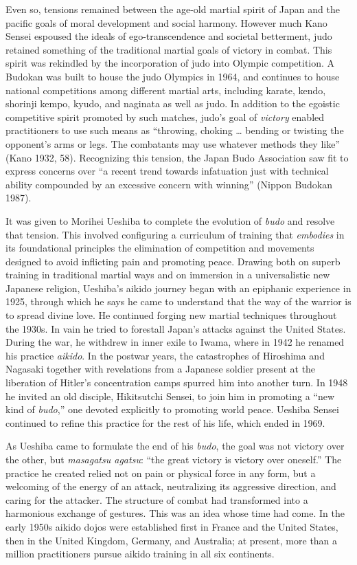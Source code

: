 Even so, tensions remained between the age-old martial spirit of Japan and the pacific goals of moral development and social harmony. However much Kano Sensei espoused the ideals of ego-transcendence and societal betterment, judo retained something of the traditional martial goals of victory in combat. This spirit was rekindled by the incorporation of judo into Olympic competition. A Budokan was built to house the judo Olympics in 1964, and continues to house national competitions among different martial arts, including karate, kendo, shorinji kempo, kyudo, and naginata as well as judo. In addition to the egoistic competitive spirit promoted by such matches, judo's goal of \emph{victory} enabled practitioners to use such means as ``throwing, choking \ldots{} bending or twisting the opponent's arms or legs. The combatants may use whatever methods they like'' (Kano 1932, 58). Recognizing this tension, the Japan Budo Association saw fit to express concerns over ``a recent trend towards infatuation just with technical ability compounded by an excessive concern with winning'' (Nippon Budokan 1987).

It was given to Morihei Ueshiba to complete the evolution of \emph{budo} and resolve that tension. This involved configuring a curriculum of training that \emph{embodies} in its foundational principles the elimination of competition and movements designed to avoid inflicting pain and promoting peace. Drawing both on superb training in traditional martial ways and on immersion in a universalistic new Japanese religion, Ueshiba's aikido journey began with an epiphanic experience in 1925, through which he says he came to understand that the way of the warrior is to spread divine love. He continued forging new martial techniques throughout the 1930s. In vain he tried to forestall Japan's attacks against the United States. During the war, he withdrew in inner exile to Iwama, where in 1942 he renamed his practice \emph{aikido}. In the postwar years, the catastrophes of Hiroshima and Nagasaki together with revelations from a Japanese soldier present at the liberation of Hitler's concentration camps spurred him into another turn. In 1948 he invited an old disciple, Hikitsutchi Sensei, to join him in promoting a ``new kind of \emph{budo},'' one devoted explicitly to promoting world peace. Ueshiba Sensei continued to refine this practice for the rest of his life, which ended in 1969.

As Ueshiba came to formulate the end of his \emph{budo}, the goal was not victory over the other, but \emph{masagatsu agatsu}: ``the great victory is victory over oneself.'' The practice he created relied not on pain or physical force in any form, but a welcoming of the energy of an attack, neutralizing its aggressive direction, and caring for the attacker. The structure of combat had transformed into a harmonious exchange of gestures. This was an idea whose time had come. In the early 1950s aikido dojos were established first in France and the United States, then in the United Kingdom, Germany, and Australia; at present, more than a million practitioners pursue aikido training in all six continents. 

